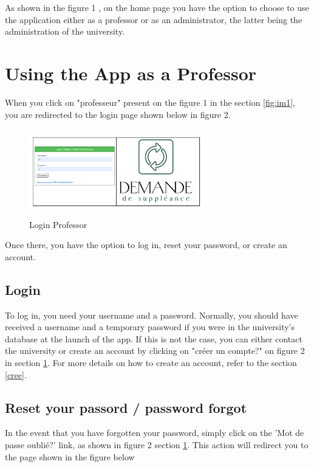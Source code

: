\documentclass[12pt]{article}
\begin{document}
As shown in the figure 1 , on the home page you have the option to choose to use the application either as a professor or as an administrator, the latter being the administration of the university.

\section{Using the App as a Professor}

When you click on "professeur"  present on the figure 1 in the section  \textcolor{blue}{\ref{fig:im1}}, you are redirected to the login page shown below in figure 2.

\begin{figure}[H]
    \centering
\includegraphics[width=0.7\textwidth]{loginprof.png}
\label{fig:im2} 
    \caption{Login Professor}
\end{figure}

Once there, you have the option to log in, reset your password, or create an account.

\subsection{Login}
To log in, you need your username and a password. Normally, you should have received a username and a temporary password if you were in the university's database at the launch of the app. If this is not the case, you can either contact the university or create an account by clicking on "créer un compte?" on figure 2 in section  \textcolor{blue}{\ref{fig:im2}}. For more details on how to create an account, refer to the section \textcolor{blue}{\ref{cree}}.
\subsection{Reset your passord / password forgot}
In the event that you have forgotten your password, simply click on the 'Mot de passe oublié?' link, as shown in figure 2 section \textcolor{blue}{\ref{fig:im2}}. This action will redirect you to the page shown in the figure below
\end{document}

